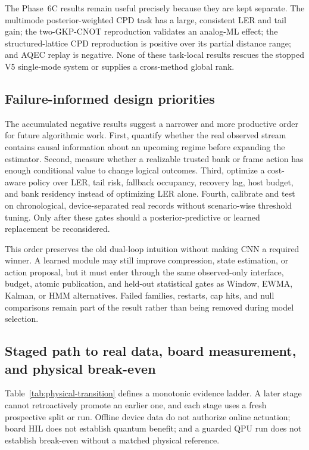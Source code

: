 \documentclass[11pt]{article}
\begin{document}
The Phase~6C results remain useful precisely because they are kept separate.
The multimode posterior-weighted CPD task has a large, consistent LER and tail
gain; the two-GKP-CNOT reproduction validates an analog-ML effect; the
structured-lattice CPD reproduction is positive over its partial distance
range; and AQEC replay is negative.  None of these task-local results rescues
the stopped V5 single-mode system or supplies a cross-method global rank.

\subsection{Failure-informed design priorities}

The accumulated negative results suggest a narrower and more productive order
for future algorithmic work.  First, quantify whether the real observed stream
contains causal information about an upcoming regime before expanding the
estimator.  Second, measure whether a realizable trusted bank or frame action
has enough conditional value to change logical outcomes.  Third, optimize a
cost-aware policy over LER, tail risk, fallback occupancy, recovery lag, host
budget, and bank residency instead of optimizing LER alone.  Fourth, calibrate
and test on chronological, device-separated real records without scenario-wise
threshold tuning.  Only after these gates should a posterior-predictive or
learned replacement be reconsidered.

This order preserves the old dual-loop intuition without making CNN a required
winner.  A learned module may still improve compression, state estimation, or
action proposal, but it must enter through the same observed-only interface,
budget, atomic publication, and held-out statistical gates as Window, EWMA,
Kalman, or HMM alternatives.  Failed families, restarts, cap hits, and null
comparisons remain part of the result rather than being removed during model
selection.

\subsection{Staged path to real data, board measurement, and physical break-even}

Table~\ref{tab:physical-transition} defines a monotonic evidence ladder.  A
later stage cannot retroactively promote an earlier one, and each stage uses a
fresh prospective split or run.  Offline device data do not authorize online
actuation; board HIL does not establish quantum benefit; and a guarded QPU run
does not establish break-even without a matched physical reference.
\end{document}
